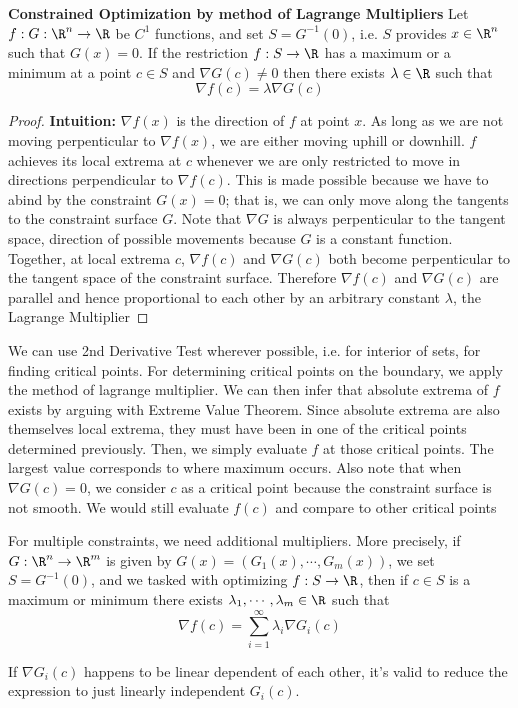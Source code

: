 \documentclass[11pt]{article}
\begin{document}
\begin{theorem*}
  \textbf{Constrained Optimization by method of Lagrange Multipliers} Let $f: G: \R^n \to \R$ be $C^1$ functions, and set $S = G^{-1}(0)$, i.e. $S$ provides $x\in\R^n$ such that $G(x) = 0$. If the restriction $f: S\to \R$ has a maximum or a minimum at a point $c\in S$ and $\nabla G(c) \neq 0$ then there exists $\lambda \in \R$ such that
  \[
    \nabla f(c) = \lambda \nabla G(c)
  \]
  \begin{proof}
    \textbf{Intuition:} $\nabla f(x)$ is the direction of $f$ at point $x$. As long as we are not moving perpenticular to $\nabla f(x)$, we are either moving uphill or downhill. $f$ achieves its local extrema at $c$ whenever we are only restricted to move in directions perpendicular to $\nabla f (c)$. This is made possible because we have to abind by the constraint $G(x) = 0$; that is, we can only move along the tangents to the constraint surface $G$. Note that $\nabla G$ is always perpenticular to the tangent space, direction of possible movements because $G$ is a constant function. Together, at local extrema $c$, $\nabla f(c)$ and $\nabla G(c)$ both become perpenticular to the tangent space of the constraint surface. Therefore $\nabla f(c)$ and $\nabla G(c)$ are parallel and hence proportional to each other by an arbitrary constant $\lambda$, the Lagrange Multiplier
  \end{proof}
  \begin{rem}
    We can use 2nd Derivative Test wherever possible, i.e. for interior of sets, for finding critical points. For determining critical points on the boundary, we apply the method of lagrange multiplier. We can then infer that absolute extrema of $f$ exists by arguing with Extreme Value Theorem. Since absolute extrema are also themselves local extrema, they must have been in one of the critical points determined previously. Then, we simply evaluate $f$ at those critical points. The largest value corresponds to where maximum occurs. Also note that when $\nabla G(c) = 0$, we consider $c$ as a critical point because the constraint surface is not smooth. We would still evaluate $f(c)$ and compare to other critical points
  \end{rem}
\end{theorem*}


\begin{proposition*}
  For multiple constraints, we need additional multipliers. More precisely, if $G: \R^n \to \R^m$ is given by $G(x) = (G_1(x), \cdots, G_m(x))$, we set $S = G^{-1}(0)$,  and we tasked with optimizing $f: S\to\R$, then if $c\in S$ is a maximum or minimum there exists $\lambda_1, \cdots, \lambda_m \in \R$ such that
  \[
    \nabla f(c) = \sum_{i=1}^{\infty} \lambda_i \nabla G_i (c)
  \]
  \begin{rem}
    If $\nabla G_i(c)$ happens to be linear dependent of each other, it's valid to reduce the expression to just linearly independent $G_i(c)$.
  \end{rem}
\end{proposition*}
\end{document}
